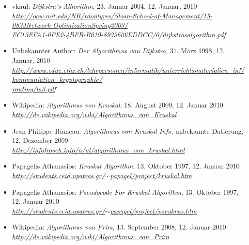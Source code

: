 \documentclass[a4paper,titlepage]{article}
\begin{document}
\begin{itemize}
\item vkaul: \emph{Dijkstra's Alhorithm}, 23. Januar 2004, 12. Januar, 2010 \\
	\emph{\href{http://ocw.mit.edu/NR/rdonlyres/Sloan-School-of-Management/15-082JNetwork-OptimizationSpring2003/FC13EFA1-0FE2-4BFB-B019-8939606EDDCC/0/dijkstrasalgorithm.pdf}{http://ocw.mit.edu/NR/rdonlyres/Sloan-School-of-Management/15-082JNetwork-OptimizationSpring2003/ \\
	FC13EFA1-0FE2-4BFB-B019-8939606EDDCC/0/dijkstrasalgorithm.pdf}}
\item Unbekannter Author: \emph{Der Algorithmus von Dijkstra}, 31. März 1998, 12. Januar, 2010 \\
	\emph{\href{http://www.educ.ethz.ch/lehrpersonen/informatik/unterrichtsmaterialien_inf/kommuniation_kryptographie/routing/la3.pdf}{http://www.educ.ethz.ch/lehrpersonen/informatik/unterrichtsmaterialien\_inf/kommuniation\_kryptographie/ \\
	routing/la3.pdf}}
\item Wikipedia: \emph{Algorithmus von Kruskal}, 18. August 2009, 12. Januar 2010 \\
	\emph{\href{http://de.wikipedia.org/wiki/Algorithmus_von_Kruskal}{http://de.wikipedia.org/wiki/Algorithmus\_von\_Kruskal}}
\item Jean-Philippe Rameau: \emph{Algorithmus von Kruskal Info}, unbekannte Datierung, 12. Dezember 2009 \\
	\emph{\href{http://infofrosch.info/a/al/algorithmus_von_kruskal.html}{http://infofrosch.info/a/al/algorithmus\_von\_kruskal.html}}
\item Papagelis Athanasios: \emph{Kruskal Algorithm}, 13. Oktober 1997, 12. Januar 2010 \\
	\emph{\href{http://students.ceid.upatras.gr/~papagel/project/kruskal.htm}{http://students.ceid.upatras.gr/$\sim$papagel/project/kruskal.htm}}
\item Papagelis Athanasios: \emph{Pseudocode For Kruskal Algorithm}, 13. Oktober 1997, 12. Januar 2010 \\
	\emph{\href{http://students.ceid.upatras.gr/~papagel/project/pseukrus.htm}{http://students.ceid.upatras.gr/$\sim$papagel/project/pseukrus.htm}}
\item Wikipedia: \emph{Algorithmus von Prim}, 13. September 2008, 12. Januar 2010 \\
	\emph{\href{http://de.wikipedia.org/wiki/Algorithmus_von_Prim}{http://de.wikipedia.org/wiki/Algorithmus\_von\_Prim}}

\end{itemize}
\end{document}
